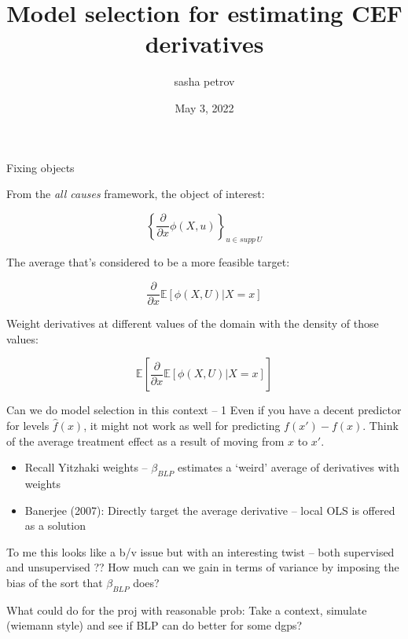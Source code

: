 \documentclass{beamer}
\title[pitch]{Model selection for estimating CEF derivatives}
\author{sasha petrov}
\date{May 3, 2022}
\begin{document}
\maketitle



\begin{frame}{Fixing objects}

From the \textit{all causes} framework, the object of interest:

	\begin{equation}
	\left\{ \frac{\partial}{\partial x} \phi(X, u) \right\}_{u \in supp \, U}
\end{equation}

The average that's considered to be a more feasible target:

\begin{equation}
	\frac{\partial}{\partial x} \mathbb{E} \left[ \phi(X, U) | X = x \right]
\end{equation}

Weight derivatives at different values of the domain with the density of those values:

\begin{equation}
	\mathbb{E} \left[ \frac{\partial}{\partial x} \mathbb{E} \left[ \phi(X, U) | X = x \right] \right]
\end{equation}


\end{frame}

\begin{frame}{Can we do model selection in this context -- 1}
	Even if you have a decent predictor for levels $\hat f(x)$, it might not work as well for predicting $f(x') - f(x)$. Think of the average treatment effect as a result of moving from $x$ to $x'$.
	
	\begin{itemize}
		\item Recall Yitzhaki weights -- $\beta_{BLP}$ estimates a `weird' average of derivatives with weights
		\item Banerjee (2007): Directly target the average derivative -- local OLS is offered as a solution
	\end{itemize}
	
To me this looks like a b/v issue but with an interesting twist -- both supervised and unsupervised ?? How much can we gain in terms of variance by imposing the bias of the sort that $\beta_{BLP}$ does?

What could do for the proj with reasonable prob: Take a context, simulate (wiemann style) and see if BLP can do better for some dgps?
\end{frame}
\end{document}
